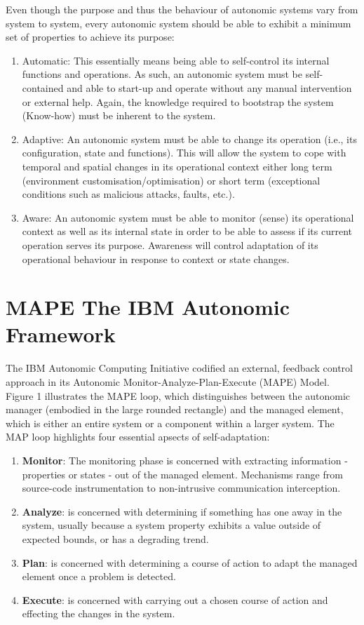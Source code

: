 Even though the purpose and thus the behaviour of autonomic systems vary from system to system, every autonomic system should be able to exhibit a minimum set of properties to achieve its purpose:
\begin{enumerate}
    \item Automatic: This essentially means being able to self-control its internal functions and operations. As such, an autonomic system must be self-contained and able to start-up and operate without any manual intervention or external help. Again, the knowledge required to bootstrap the system (Know-how) must be inherent to the system.
    \item Adaptive: An autonomic system must be able to change its operation (i.e., its configuration, state and functions). This will allow the system to cope with temporal and spatial changes in its operational context either long term (environment customisation/optimisation) or short term (exceptional conditions such as malicious attacks, faults, etc.).
    \item Aware: An autonomic system must be able to monitor (sense) its operational context as well as its internal state in order to be able to assess if its current operation serves its purpose. Awareness will control adaptation of its operational behaviour in response to context or state changes.
\end{enumerate}

\section{MAPE The IBM Autonomic Framework}
The IBM Autonomic Computing Initiative codified an external, feedback control approach in its Autonomic Monitor-Analyze-Plan-Execute (MAPE) Model. Figure 1 illustrates the MAPE loop, which distinguishes between the autonomic manager (embodied in the large rounded rectangle) and the managed element, which is either an entire system or a component within a larger system. The MAP loop highlights four essential apsects of self-adaptation:
\begin{enumerate}
    \item \textbf{Monitor}: The monitoring phase is concerned with extracting information - properties or states - out of the managed element. Mechanisms range from source-code instrumentation to non-intrusive communication interception.
    \item \textbf{Analyze}: is concerned with determining if something has one away in the system, usually because a system property exhibits a value outside of expected bounds, or has a degrading trend.
    \item \textbf{Plan}: is concerned with determining a course of action to adapt the managed element once a problem is detected.
    \item \textbf{Execute}: is concerned with carrying out a chosen course of action and effecting the changes in the system.
\end{enumerate}
 
